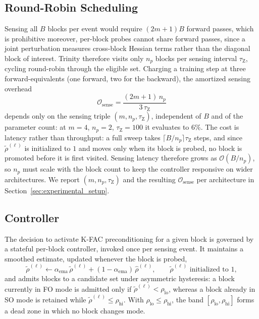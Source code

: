 \documentclass[conference]{IEEEtran}
\begin{document}
\subsection{Round-Robin Scheduling}
\label{subsec:round_robin}
Sensing all $B$ blocks per event would require $(2m+1)B$ forward passes, which is prohibitive moreover, per-block probes cannot share forward passes, since a joint perturbation measures cross-block Hessian terms rather than the diagonal block of interest. Trinity therefore visits only $n_p$ blocks per sensing interval $\tau_{\mathrm{Z}}$, cycling round-robin through the eligible set. Charging a training step at three forward-equivalents (one forward, two for the backward), the amortized sensing overhead
\begin{equation}
\mathcal{O}_{\mathrm{sense}} = \frac{(2m+1)\,n_p}{3\,\tau_{\mathrm{Z}}}
\label{eq:sense_overhead}
\end{equation}
depends only on the sensing triple $(m, n_p, \tau_{\mathrm{Z}})$, independent of $B$ and of the parameter count: at $m=4$, $n_p=2$, $\tau_{\mathrm{Z}}=100$ it evaluates to $6\%$. The cost is latency rather than throughput: a full sweep takes $\lceil B/n_p \rceil \tau_{\mathrm{Z}}$ steps, and since $\tilde{\rho}^{(\ell)}$ is initialized to $1$ and moves only when its block is probed, no block is promoted before it is first visited. Sensing latency therefore grows as $\mathcal{O}(B/n_p)$, so $n_p$ must scale with the block count to keep the controller responsive on wider architectures. We report $(m, n_p, \tau_{\mathrm{Z}})$ and the resulting $\mathcal{O}_{\mathrm{sense}}$ per architecture in Section~\ref{sec:experimental_setup}.

\subsection{Controller}
\label{subsec:controller}
The decision to activate K-FAC preconditioning for a given block is governed by a stateful per-block controller, invoked once per sensing event. It maintains a smoothed estimate, updated whenever the block is probed,
\begin{equation}
\tilde{\rho}^{(\ell)} \leftarrow \alpha_{\mathrm{ema}}\,\tilde{\rho}^{(\ell)} + (1 - \alpha_{\mathrm{ema}})\,\hat{\rho}^{(\ell)},
\qquad \tilde{\rho}^{(\ell)} \text{ initialized to } 1,
\label{eq:rho_ema}
\end{equation}
and admits blocks to a candidate set under asymmetric hysteresis: a block currently in FO mode is admitted only if $\tilde{\rho}^{(\ell)} < \rho_{\mathrm{lo}}$, whereas a block already in SO mode is retained while $\tilde{\rho}^{(\ell)} \le \rho_{\mathrm{hi}}$. With $\rho_{\mathrm{lo}} \le \rho_{\mathrm{hi}}$, the band $[\rho_{\mathrm{lo}}, \rho_{\mathrm{hi}}]$ forms a dead zone in which no block changes mode. 
\end{document}

